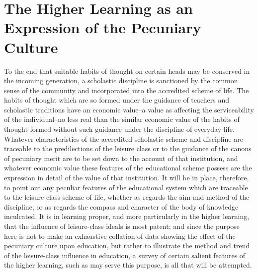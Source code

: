 \documentclass[12pt]{report}
\begin{document}
\chapter{The Higher Learning as an Expression of
the Pecuniary Culture}

To the end that suitable habits of thought on certain heads may be
conserved in the incoming generation, a scholastic discipline is
sanctioned by the common sense of the community and incorporated into
the accredited scheme of life. The habits of thought which are so
formed under the guidance of teachers and scholastic traditions have
an economic value--a value as affecting the serviceability of the
individual--no less real than the similar economic value of the habits
of thought formed without such guidance under the discipline of everyday
life. Whatever characteristics of the accredited scholastic scheme and
discipline are traceable to the predilections of the leisure class or to
the guidance of the canons of pecuniary merit are to be set down to the
account of that institution, and whatever economic value these features
of the educational scheme possess are the expression in detail of the
value of that institution. It will be in place, therefore, to point out
any peculiar features of the educational system which are traceable to
the leisure-class scheme of life, whether as regards the aim and method
of the discipline, or as regards the compass and character of the body
of knowledge inculcated. It is in learning proper, and more particularly
in the higher learning, that the influence of leisure-class ideals is
most patent; and since the purpose here is not to make an exhaustive
collation of data showing the effect of the pecuniary culture upon
education, but rather to illustrate the method and trend of the
leisure-class influence in education, a survey of certain salient
features of the higher learning, such as may serve this purpose, is all
that will be attempted.
\end{document}
